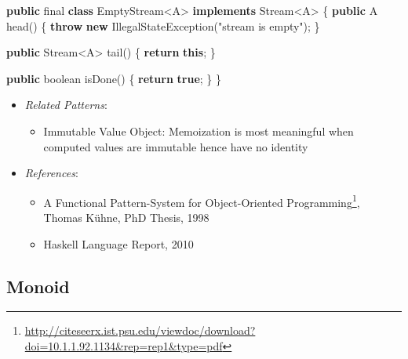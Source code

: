 \documentclass[11pt,]{article}
\newenvironment{Shaded}{}{}
\newcommand{\KeywordTok}[1]{\textcolor[rgb]{0.00,0.44,0.13}{\textbf{{#1}}}}
\newcommand{\DataTypeTok}[1]{\textcolor[rgb]{0.56,0.13,0.00}{{#1}}}
\newcommand{\StringTok}[1]{\textcolor[rgb]{0.25,0.44,0.63}{{#1}}}
\newcommand{\FunctionTok}[1]{\textcolor[rgb]{0.02,0.16,0.49}{{#1}}}
\newcommand{\NormalTok}[1]{{#1}}
\renewcommand{\href}[2]{#2\footnote{\url{#1}}}
\begin{document}
\begin{Shaded}
\begin{Highlighting}[]
\KeywordTok{public} \DataTypeTok{final} \KeywordTok{class} \NormalTok{EmptyStream<A> }\KeywordTok{implements} \NormalTok{Stream<A> \{}
  \KeywordTok{public} \NormalTok{A }\FunctionTok{head}\NormalTok{() \{ }\KeywordTok{throw} \KeywordTok{new} \NormalTok{IllegalStateException(}\StringTok{"stream is empty"}\NormalTok{); \}}
  
  \KeywordTok{public} \NormalTok{Stream<A> }\FunctionTok{tail}\NormalTok{() \{ }\KeywordTok{return} \KeywordTok{this}\NormalTok{; \}}
  
  \KeywordTok{public} \DataTypeTok{boolean} \FunctionTok{isDone}\NormalTok{() \{ }\KeywordTok{return} \KeywordTok{true}\NormalTok{; \}}
\NormalTok{\}}
\end{Highlighting}
\end{Shaded}

\begin{itemize}
\item
  \emph{Related Patterns}:

  \begin{itemize}
  \item
    Immutable Value Object: Memoization is most meaningful when computed
    values are immutable hence have no identity
  \end{itemize}
\item
  \emph{References}:

  \begin{itemize}
  \item
    \href{http://citeseerx.ist.psu.edu/viewdoc/download?doi=10.1.1.92.1134\&rep=rep1\&type=pdf}{A
    Functional Pattern-System for Object-Oriented Programming}, Thomas
    Kühne, PhD Thesis, 1998
  \item
    Haskell Language Report, 2010
  \end{itemize}
\end{itemize}

\subsection{Monoid}
\end{document}
